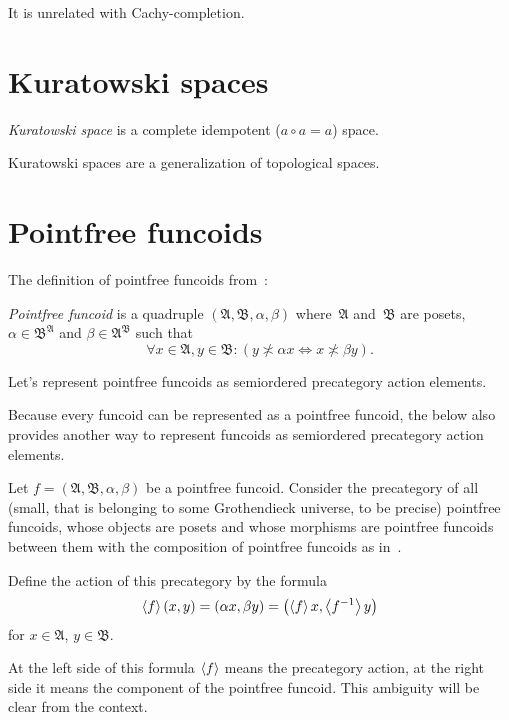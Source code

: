 \begin{note}
It is unrelated with Cachy-completion.
\end{note}

\chapter{Kuratowski spaces}

\begin{defn}
\emph{Kuratowski space} is a complete idempotent ($a\circ a=a$) space.
\end{defn}

Kuratowski spaces are a generalization of topological spaces.

\chapter{Pointfree funcoids}

The definition of pointfree funcoids from~\cite{volume-1}:

\begin{defn}
\emph{Pointfree funcoid} is a quadruple
$(\mathfrak{A},\mathfrak{B},\alpha,\beta)$ where~$\mathfrak{A}$
and~$\mathfrak{B}$ are posets, $\alpha\in\mathfrak{B}^{\mathfrak{A}}$
and $\beta\in\mathfrak{A}^{\mathfrak{B}}$ such that 
\[
\forall x\in\mathfrak{A},y\in\mathfrak{B}:(y\nasymp\alpha x\Leftrightarrow x\nasymp\beta y).
\]
\end{defn}

Let's represent pointfree funcoids as semiordered precategory action elements.

\begin{rem}
Because every funcoid can be represented as a pointfree funcoid, the below also provides another way to represent funcoids as semiordered precategory action elements.
\end{rem}

Let $f=(\mathfrak{A},\mathfrak{B},\alpha,\beta)$ be a pointfree funcoid. Consider the precategory of all (small, that is belonging to some Grothendieck universe, to be precise) pointfree funcoids, whose objects are posets and whose morphisms are pointfree funcoids between them with the composition of pointfree funcoids as in~\cite{volume-1}.

Define the action of this precategory by the formula
\[ \left\langle f\right\rangle(x,y)=(\alpha x,\beta y)=\left(\left\langle f\right\rangle x,\left\langle f^{-1}\right\rangle y\right) \]
for $x\in\mathfrak{A}$, $y\in\mathfrak{B}$.

\begin{note}
At the left side of this formula $\left\langle f\right\rangle$ means the precategory action, at the right side it means the component of the pointfree funcoid. This ambiguity will be clear from the context.
\end{note}

